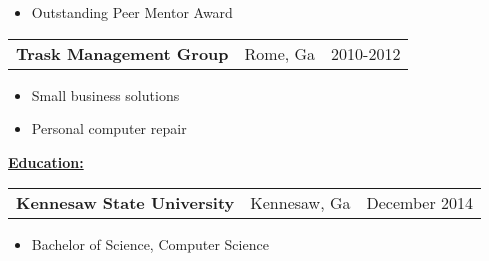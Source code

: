 \documentclass{book}
\newenvironment{myitemize}
{ \begin{itemize}
	\setlength{\itemsep}{0pt}
	\setlength{\parskip}{0pt}
	\setlength{\parsep}{0pt}     }
{ \end{itemize}                  }
\begin{document}
	\begin{myitemize}
		\item Outstanding Peer Mentor Award 
	\end{myitemize} 


\begin{tabular}{L{3in}L{1.75in}R{1.75in}}

	 {\large {\bfseries Trask Management Group}} & Rome, Ga & 2010-2012 \\

\end{tabular}

\begin{myitemize}
	
	\item Small business solutions

\end{myitemize}

\begin{myitemize}
	
	\item Personal computer repair

\end{myitemize}

\underline{\Large {\bfseries Education:}}

\enspace

\begin{tabular}{L{3in}L{1.75in}R{1.75in}}

	{\large {\bfseries Kennesaw State University}} & Kennesaw, Ga & December 2014 \\%

\end{tabular}

\begin{myitemize}

	\item Bachelor of Science, Computer Science 

\end{myitemize}
\end{document}
